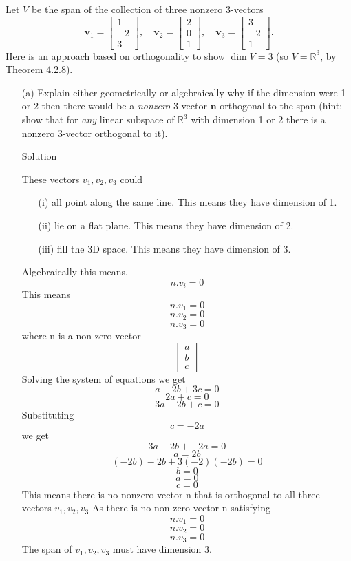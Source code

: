 
Let $V$ be the span of the collection of three nonzero 3-vectors
\[
\mathbf{v}_1 = 
\begin{bmatrix}
1 \\ -2 \\ 3
\end{bmatrix}, \quad
\mathbf{v}_2 = 
\begin{bmatrix}
2 \\ 0 \\ 1
\end{bmatrix}, \quad
\mathbf{v}_3 = 
\begin{bmatrix}
3 \\ -2 \\ 1
\end{bmatrix}.
\]
Here is an approach based on orthogonality to show $\dim V = 3$ (so $V = \mathbb{R}^3$, by Theorem 4.2.8).
\begin{enumerate}
\item[(a)] Explain either geometrically or algebraically why if the dimension were 1 or 2 then there would be a \textit{nonzero} 3-vector $\mathbf{n}$ orthogonal to the span (hint: show that for \textit{any} linear subspace of $\mathbb{R}^3$ with dimension 1 or 2 there is a nonzero 3-vector orthogonal to it).

Solution

These vectors $v_1,v_2,v_3$ could 
\begin{enumerate}
    \item[(i)] all point along the same line. This means they have dimension of 1. 
    \item[(ii)] lie on a flat plane. This means they have dimension of 2.
    \item[(iii)] fill the 3D space. This means they have dimension of 3.
\end{enumerate}
Algebraically this means,
\[
n. v_i = 0
\]
This means
\[
n . v_1 = 0
\]
\[
n . v_2 = 0
\]
\[
n . v_3 = 0
\]
where n is a non-zero vector 
\[
\begin{bmatrix}
a \\ b \\ c
\end{bmatrix}
\]
Solving the system of equations we get 
\[
a - 2b + 3c = 0
\]
\[
2a + c = 0
\]
\[
3a -2b + c  = 0
\]
Substituting 
\[
c = -2a
\]
we get
\[
3a - 2b + -2a = 0
\]
\[
a = 2b
\]
\[
(-2b) - 2b + 3(-2)(-2b) = 0
\]
\[
b = 0
\]
\[
a = 0
\]
\[
c =0
\]
This means there is no nonzero vector n that is orthogonal to all three vectors $v_1, v_2, v_3$
As there is no non-zero vector n satisfying 
\[
n. v_1 = 0
\]
\[
n. v_2 = 0
\]
\[
n. v_3 = 0
\]
The span of $v_1, v_2, v_3$ must have dimension 3.


\end{enumerate}
